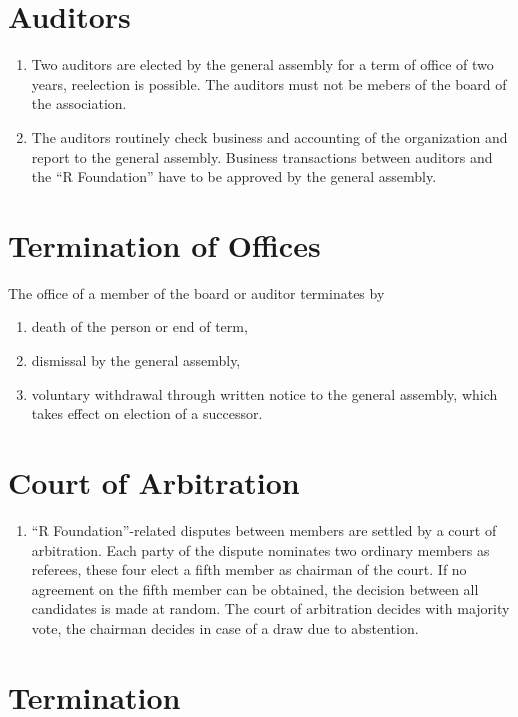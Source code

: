 \documentclass[a4paper]{article}
\newcommand{\RF}{``R Foundation''}
\begin{document}
\section{Auditors}

\begin{enumerate}
 \item Two auditors are elected by the general assembly for a term of
  office of two years, reelection is possible.  The auditors must not
  be mebers of the board of the association.
 \item The auditors routinely check business and accounting of the
  organization and report to the general assembly. Business
  transactions between auditors and the \RF{} have to be approved by
  the general assembly.
\end{enumerate}

\section{Termination of Offices}

The office of a member of the board or auditor terminates by
\begin{enumerate}
 \item death of the person or end of term,
 \item dismissal by the general assembly,
 \item voluntary withdrawal through written notice to the general
  assembly, which takes effect on election of a successor.
\end{enumerate}

\section{Court of Arbitration}

\begin{enumerate}
 \item \RF{}-related disputes between members are settled by a court
  of arbitration. Each party of the dispute nominates two ordinary
  members as referees, these four elect a fifth member as chairman of
  the court.  If no agreement on the fifth member can be obtained, the
  decision between all candidates is made at random. The court of
  arbitration decides with majority vote, the chairman decides in case
  of a draw due to abstention.

\end{enumerate}

\section{Termination}
\end{document}
